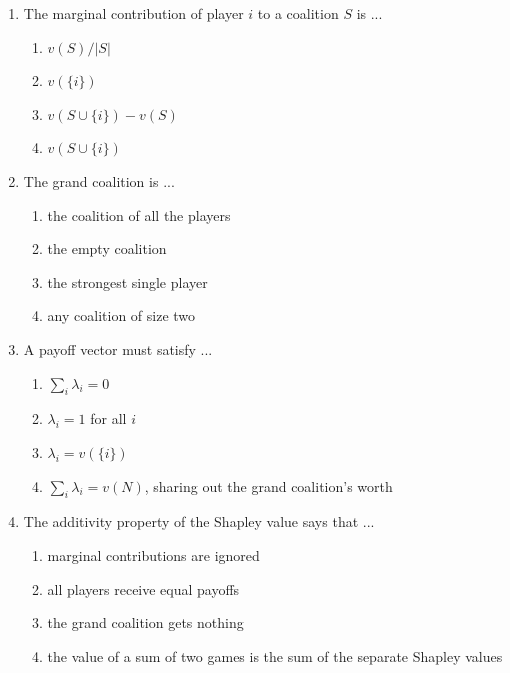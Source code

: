 \documentclass[11pt]{article}
\begin{document}
\begin{enumerate}[itemsep=6pt]
  \begin{enumerate}
    \item join last always tie
    \item have the same name receive equal payoffs
    \item are both null players receive everything
    \item contribute equally to every coalition receive equal Shapley values
  \end{enumerate}
  \item The marginal contribution of player \(i\) to a coalition \(S\) is ...
  \begin{enumerate}
    \item \(v(S) / |S|\)
    \item \(v(\{i\})\)
    \item \(v(S \cup \{i\}) - v(S)\)
    \item \(v(S \cup \{i\})\)
  \end{enumerate}
  \item The grand coalition is ...
  \begin{enumerate}
    \item the coalition of all the players
    \item the empty coalition
    \item the strongest single player
    \item any coalition of size two
  \end{enumerate}
  \item A payoff vector must satisfy ...
  \begin{enumerate}
    \item \(\sum_i \lambda_i = 0\)
    \item \(\lambda_i = 1\) for all \(i\)
    \item \(\lambda_i = v(\{i\})\)
    \item \(\sum_i \lambda_i = v(N)\), sharing out the grand coalition's worth
  \end{enumerate}
  \item The additivity property of the Shapley value says that ...
  \begin{enumerate}
    \item marginal contributions are ignored
    \item all players receive equal payoffs
    \item the grand coalition gets nothing
    \item the value of a sum of two games is the sum of the separate Shapley values
  \end{enumerate}

\end{enumerate}
\end{document}
